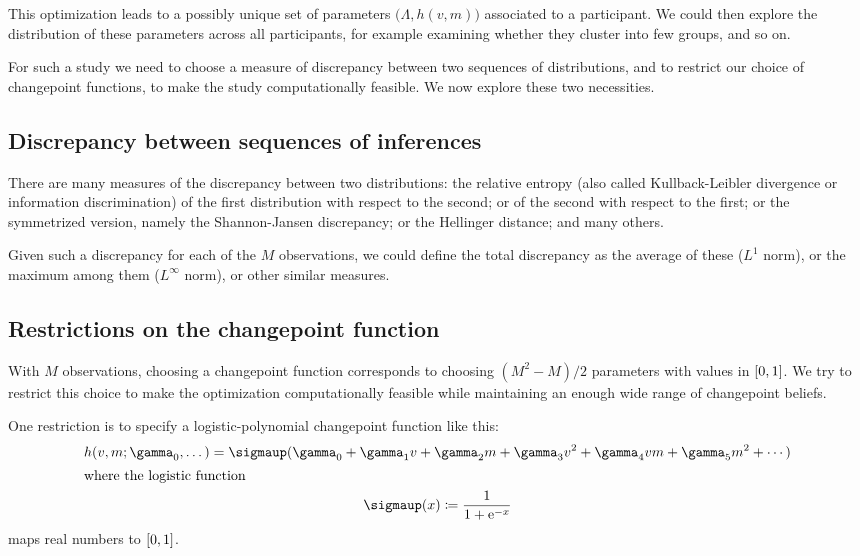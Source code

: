 \documentclass[\ifafour a4paper,12pt,\else a5paper,10pt,\fi%
onecolumn,oneside,article,%
british%
]{memoir}
\theoremstyle{remark}
\theoremstyle{innote}
\newcommand*{\e}{\mathrm{e}}%
\newcommand*{\defd}{\coloneqq}
\DeclarePairedDelimiter\clcl{[}{]}
\renewcommand*{\|}{\mathpunct{|}}
\newcommand*{\yN}{\varLambda}
\newcommand*{\yrs}{h}
\newcommand*{\logistic}{\sigmaup}
\begin{document}
This optimization leads to a possibly unique set of parameters
$\bigl(\yN, \yrs(v,m)\bigr)$ associated to a participant. We could then
explore the distribution of these parameters across all participants, for
example examining whether they cluster into few groups, and so on.

For such a study we need to choose a measure of discrepancy between two
sequences of distributions, and to restrict our choice of changepoint
functions, to make the study computationally feasible. We now explore these
two necessities.

\subsection{Discrepancy between sequences of inferences}
\label{sec:discrepancy_measure}

There are many measures of the discrepancy between two distributions: the
relative entropy (also called Kullback-Leibler divergence or information
discrimination) of the first distribution with respect to the second; or of
the second with respect to the first; or the symmetrized version, namely the
Shannon-Jansen discrepancy; or the Hellinger distance; and many others.

Given such a discrepancy for each of the $M$ observations, we could define
the total discrepancy as the average of these ($L^1$ norm), or the maximum
among them ($L^{\infty}$ norm), or other similar measures.

\subsection{Restrictions on the changepoint function}
\label{sec:restrictions_h}

With $M$ observations, choosing a changepoint function corresponds to
choosing $(M^2-M)/2$ parameters with values in $\clcl{0,1}$. We try to
restrict this choice to make the optimization computationally feasible
while maintaining an enough wide range of changepoint beliefs.

One restriction is to specify a logistic-polynomial changepoint function
like this:
\begin{gather}
  \label{eq:changepoint_logistic_general}
  \yrs(v,m ; \gamma_0,\dotsc) =
  \logistic(\gamma_0 + \gamma_1 v + \gamma_2 m +
  \gamma_3 v^2 + \gamma_4  v m + \gamma_5 m^2 + \dotsb)
  \\
  \shortintertext{where the logistic function}
  \label{eq:logistic_def}
  \logistic(x) \defd \frac{1}{1+\e^{-x}} 
\end{gather}
maps real numbers to $\clcl{0,1}$.
\end{document}
